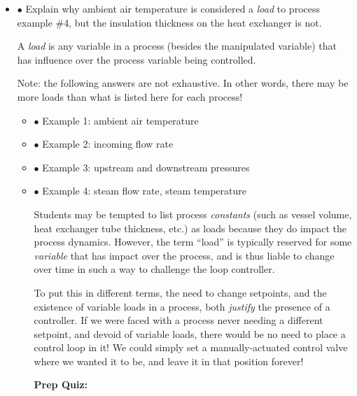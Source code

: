 \begin{itemize}
\item{$\bullet$} Explain why ambient air temperature is considered a {\it load} to process example \#4, but the insulation thickness on the heat exchanger is not.
\medskip







A {\it load} is any variable in a process (besides the manipulated variable) that has influence over the process variable being controlled.

\vskip 10pt

Note: the following answers are not exhaustive.  In other words, there may be more loads than what is listed here for each process!

\begin{itemize}
\item{$\bullet$} Example 1: ambient air temperature
\item{$\bullet$} Example 2: incoming flow rate
\item{$\bullet$} Example 3: upstream and downstream pressures
\item{$\bullet$} Example 4: steam flow rate, steam temperature
\medskip







Students may be tempted to list process {\it constants} (such as vessel volume, heat exchanger tube thickness, etc.) as loads because they do impact the process dynamics.  However, the term ``load'' is typically reserved for some {\it variable} that has impact over the process, and is thus liable to change over time in such a way to challenge the loop controller.

To put this in different terms, the need to change setpoints, and the existence of variable loads in a process, both {\it justify} the presence of a controller.  If we were faced with a process never needing a different setpoint, and devoid of variable loads, there would be no need to place a control loop in it!  We could simply set a manually-actuated control valve where we wanted it to be, and leave it in that position forever!

\vfil \eject

\noindent
{\bf Prep Quiz:}


\end{itemize}
\end{itemize}
